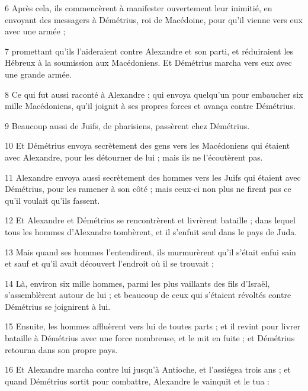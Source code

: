 \par 6 Après cela, ils commencèrent à manifester ouvertement leur inimitié, en envoyant des messagers à Démétrius, roi de Macédoine, pour qu'il vienne vers eux avec une armée ;

\par 7 promettant qu'ils l'aideraient contre Alexandre et son parti, et réduiraient les Hébreux à la soumission aux Macédoniens. Et Démétrius marcha vers eux avec une grande armée.

\par 8 Ce qui fut aussi raconté à Alexandre ; qui envoya quelqu'un pour embaucher six mille Macédoniens, qu'il joignit à ses propres forces et avança contre Démétrius.

\par 9 Beaucoup aussi de Juifs, de pharisiens, passèrent chez Démétrius.

\par 10 Et Démétrius envoya secrètement des gens vers les Macédoniens qui étaient avec Alexandre, pour les détourner de lui ; mais ils ne l'écoutèrent pas.

\par 11 Alexandre envoya aussi secrètement des hommes vers les Juifs qui étaient avec Démétrius, pour les ramener à son côté ; mais ceux-ci non plus ne firent pas ce qu'il voulait qu'ils fassent.

\par 12 Et Alexandre et Démétrius se rencontrèrent et livrèrent bataille ; dans lequel tous les hommes d'Alexandre tombèrent, et il s'enfuit seul dans le pays de Juda.

\par 13 Mais quand ses hommes l'entendirent, ils murmurèrent qu'il s'était enfui sain et sauf et qu'il avait découvert l'endroit où il se trouvait ;

\par 14 Là, environ six mille hommes, parmi les plus vaillants des fils d'Israël, s'assemblèrent autour de lui ; et beaucoup de ceux qui s'étaient révoltés contre Démétrius se joignirent à lui.

\par 15 Ensuite, les hommes affluèrent vers lui de toutes parts ; et il revint pour livrer bataille à Démétrius avec une force nombreuse, et le mit en fuite ; et Démétrius retourna dans son propre pays.

\par 16 Et Alexandre marcha contre lui jusqu'à Antioche, et l'assiégea trois ans ; et quand Démétrius sortit pour combattre, Alexandre le vainquit et le tua :

